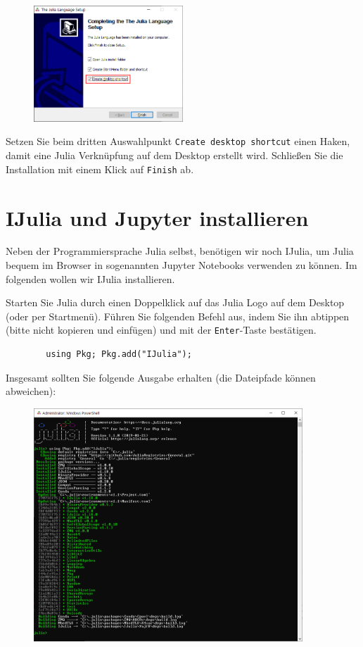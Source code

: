 \documentclass[11pt, a4paper]{scrartcl}
\begin{document}
	\begin{figure}[h!]
	\centering
	\includegraphics[width=0.5\textwidth]{imgs/install_finish.png}
	\end{figure}

	Setzen Sie beim dritten Auswahlpunkt \texttt{Create desktop shortcut} einen Haken, damit eine Julia Verknüpfung auf dem Desktop erstellt wird. Schließen Sie die Installation mit einem Klick auf \texttt{Finish} ab.
	
	\newpage
	\section{IJulia und Jupyter installieren}
	
	Neben der Programmiersprache Julia selbst, benötigen wir noch IJulia, um Julia bequem im Browser in sogenannten Jupyter Notebooks verwenden zu können. Im folgenden wollen wir IJulia installieren.

	Starten Sie Julia durch einen Doppelklick auf das Julia Logo auf dem Desktop (oder per Startmenü). Führen Sie folgenden Befehl aus, indem Sie ihn abtippen (bitte nicht kopieren und einfügen) und mit der \texttt{Enter}-Taste bestätigen.
	
	\begin{lstlisting}
		using Pkg; Pkg.add("IJulia");
	\end{lstlisting}

	Insgesamt sollten Sie folgende Ausgabe erhalten (die Dateipfade können abweichen):
	
	\begin{figure}[h!]
	\centering
	\includegraphics[width=0.9\textwidth]{imgs/IJulia_install.png}
	\end{figure}
\end{document}
